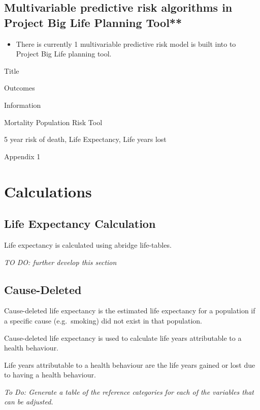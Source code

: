 \documentclass[]{book}
\providecommand{\tightlist}{%
  \setlength{\itemsep}{0pt}\setlength{\parskip}{0pt}}
\begin{document}
\subsection{Multivariable predictive risk algorithms in Project Big Life
Planning
Tool**}\label{multivariable-predictive-risk-algorithms-in-project-big-life-planning-tool}

\begin{itemize}
\tightlist
\item
  There is currently 1 multivariable predictive risk model is built into
  to Project Big Life planning tool.
\end{itemize}

Title

Outcomes

Information

Mortality Population Risk Tool

5 year risk of death, Life Expectancy, Life years lost

Appendix 1

\section{Calculations}\label{calculations}

\subsection{Life Expectancy
Calculation}\label{life-expectancy-calculation}

Life expectancy is calculated using abridge life-tables.

\emph{TO DO: further develop this section}

\subsection{Cause-Deleted}\label{cause-deleted}

Cause-deleted life expectancy is the estimated life expectancy for a
population if a specific cause (e.g.~smoking) did not exist in that
population.

Cause-deleted life expectancy is used to calculate life years
attributable to a health behaviour.

Life years attributable to a health behaviour are the life years gained
or lost due to having a health behaviour.

\emph{To Do: Generate a table of the reference categories for each of
the variables that can be adjusted.}
\end{document}

